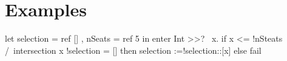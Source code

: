 


\section{Examples}
\label{sec:examples}

\begin{TASK}
  let selection = ref [] , nSeats = ref 5 in
    enter Int >>? \ x. if x <= !nSteats /\ intersection x !selection = []
                       then selection :=!selection::[x] else fail

\end{TASK}
